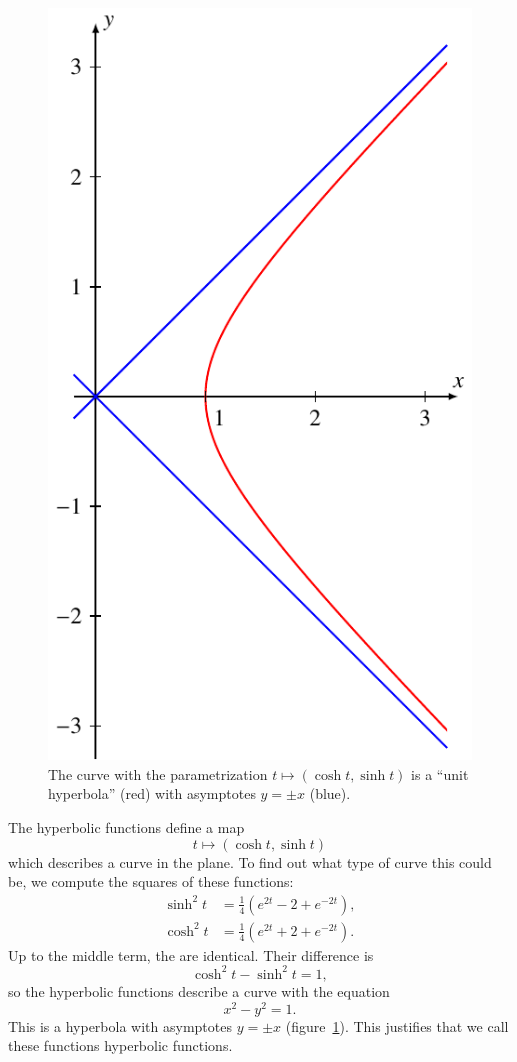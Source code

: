 \begin{figure}
\centering
\includegraphics{b-sinh/images/hyperbola.pdf}
\caption{The curve with the parametrization
$t\mapsto (\cosh t, \sinh t)$ is a ``unit hyperbola'' (red) with 
asymptotes
$y=\pm x$ (blue).
\label{anhang:hyperbel}}
\end{figure}
The hyperbolic functions define a map
\[
t\mapsto (\cosh t, \sinh t)
\]
which describes a curve in the plane.
To find out what type of curve this could be, we compute the
squares of these functions:
\begin{align}
\sinh^2 t&=\frac14(e^{2t}-2+e^{-2t}),
\\
\cosh^2 t&=\frac14(e^{2t}+2+e^{-2t}).
\label{hyp:definition}
\end{align}
Up to the middle term, the are identical.
Their difference is
\[
\cosh^2t - \sinh^2t=1,
\]
so the hyperbolic functions describe a curve with the equation
\[
x^2-y^2=1.
\]
This is a hyperbola with asymptotes $y=\pm x$
(figure~\ref{anhang:hyperbel}).
This justifies that we call these functions hyperbolic functions.

